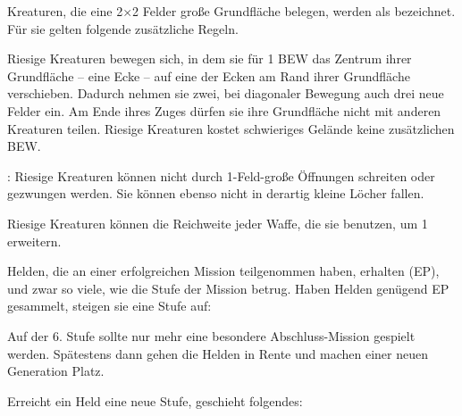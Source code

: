 {			

		Kreaturen, die eine 2×2 Felder große Grundfläche belegen, werden als  bezeichnet. Für sie gelten folgende zusätzliche Regeln.

		 Riesige Kreaturen bewegen sich, in dem sie für 1 BEW das Zentrum ihrer Grundfläche -- eine Ecke -- auf eine der Ecken am Rand ihrer Grundfläche verschieben. Dadurch nehmen sie zwei, bei diagonaler Bewegung auch drei neue Felder ein. Am Ende ihres Zuges dürfen sie ihre Grundfläche nicht mit anderen Kreaturen teilen. Riesige Kreaturen kostet schwieriges Gelände keine zusätzlichen BEW.

		: Riesige Kreaturen können nicht durch 1-Feld-große Öffnungen schreiten oder gezwungen werden. Sie können ebenso nicht in derartig kleine Löcher fallen.

		 Riesige Kreaturen können die Reichweite jeder Waffe, die sie benutzen, um 1 erweitern.

		Helden, die an einer erfolgreichen Mission teilgenommen haben, erhalten  (EP), und zwar so viele, wie die Stufe der Mission betrug. Haben Helden genügend EP gesammelt, steigen sie eine Stufe auf:


		\noindent
		Auf der 6. Stufe sollte nur mehr eine besondere Abschluss-Mission gespielt werden. Spätestens dann gehen die Helden in Rente und machen einer neuen Generation Platz.

			Erreicht ein Held eine neue Stufe, geschieht folgendes:


}
